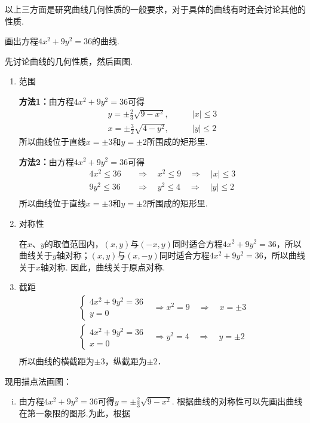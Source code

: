 以上三方面是研究曲线几何性质的一般要求，对于具体的曲线有时还会讨论其他的性质.

\begin{example}
    画出方程$4x^2+9y^2=36$的曲线.
\end{example}

\begin{solution}
先讨论曲线的几何性质，然后画图.
\begin{enumerate}[(1)]
    \item 范围
    
\textbf{方法1：}由方程$4x^2+9y^2=36$可得
\[\begin{split}
    y=\pm \frac{2}{3}\sqrt{9-x^2},&\qquad |x|\le 3\\
    x=\pm \frac{3}{2}\sqrt{4-y^2},&\qquad |y|\le 2
\end{split}\]
所以曲线位于直线$x=\pm 3$和$y=\pm 2$所围成的矩形里.

\textbf{方法2：}由方程$4x^2+9y^2=36$可得
\[\begin{split}
    4x^2\le 36&\quad \Rightarrow \quad x^2\le 9\quad \Rightarrow \quad |x|\le 3\\
    9y^2\le 36&\quad \Rightarrow \quad y^2\le 4\quad \Rightarrow\quad  |y|\le 2\\
\end{split}\]
所以曲线位于直线$x=\pm 3$和$y=\pm 2$所围成的矩形里.

\item 对称性

在$x$、$y$的取值范围内，$(x,y)$与$(-x,y)$同时适合方程$4x^2+9y^2=36$，所以曲线关于$y$轴对称；$(x,y)$与$(x,-y)$同时适合方程$4x^2+9y^2=36$，所以曲线关于$x$轴对称. 因此，曲线关于原点对称.
\item 截距
\[\begin{split}
    \begin{cases}
        4x^2+9y^2=36\\ y=0
    \end{cases}&\Rightarrow x^2=9\quad \Rightarrow\quad x=\pm3\\
    \begin{cases}
        4x^2+9y^2=36\\ x=0
    \end{cases}&\Rightarrow y^2=4\quad \Rightarrow\quad y=\pm2\\
\end{split}\]
所以曲线的横截距为$\pm 3$，纵截距为$\pm 2$．
\end{enumerate}

现用描点法画图：
\begin{enumerate}[(i)]
    \item 由方程$4x^2+9y^2=36$可得$y=\pm\frac{2}{3}\sqrt{9-x^2}$. 根据曲线的对称性可以先画出曲线在第一象限的图形.为此，根据


\end{enumerate}
\end{solution}
